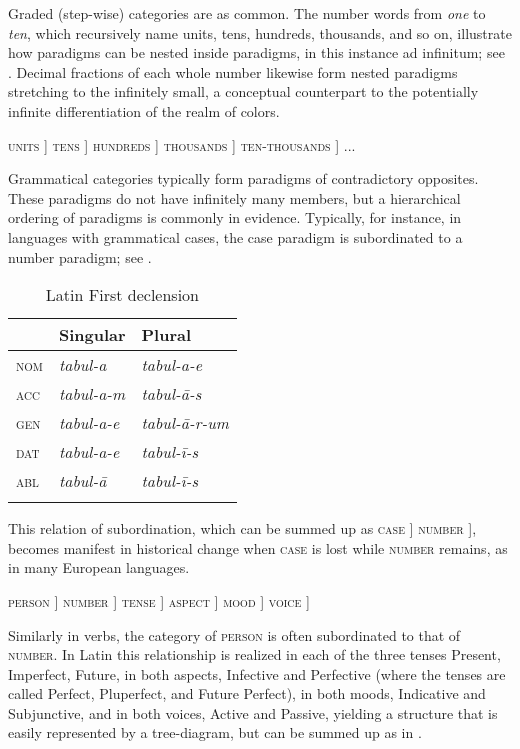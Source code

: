 \documentclass[output=paper, colorlinks,citecolor=brown]{langsci/langscibook}
\begin{document}
Graded (step-wise) categories are as common. The number words from \textit{one} to \textit{ten}, which recursively name units, tens, hundreds, thousands, and so on, illustrate how paradigms can be nested inside paradigms, in this instance ad infinitum; see . Decimal fractions of each whole number likewise form nested paradigms stretching to the infinitely small, a conceptual counterpart to the potentially infinite differentiation of the realm of colors. 

\begin{exe}
    \ex \label{ex:andersen_1} \textsc{units} ] \textsc{tens} ] \textsc{hundreds} ] \textsc{thousands} ] \textsc{ten-thousands} ] ...
\end{exe}

Grammatical categories typically form paradigms of contradictory opposites. These paradigms do not have infinitely many members, but a hierarchical ordering of paradigms is commonly in evidence. Typically, for instance, in languages with grammatical cases, the case paradigm is subordinated to a number paradigm; see . 

\begin{table}
\caption{Latin First declension\label{tab:andersen_1}}
\begin{tabular}{>{\scshape}lll} 
\lsptoprule
& Singular & Plural\\\midrule
nom & \textit{tabul-a} & \textit{tabul-a-e}\\
acc & \textit{tabul-a-m} & \textit{tabul-ā-s}\\
gen & \textit{tabul-a-e} & \textit{tabul-ā-r-um} \\
dat & \textit{tabul-a-e} & \textit{tabul-ī-s}\\
abl & \textit{tabul-ā} & \textit{tabul-ī-s}\\
\lspbottomrule
\end{tabular}
\end{table}

This relation of subordination, which can be summed up as \textsc{case} ] \textsc{number} ], becomes manifest in historical change when \textsc{case} is lost while \textsc{number} remains, as in many European languages. 

\begin{exe}
    \ex \label{ex:andersen_2} \textsc{person} ] \textsc{number} ] \textsc{tense} ] \textsc{aspect} ] \textsc{mood} ] \textsc{voice} ] 
\end{exe}


Similarly in verbs, the category of \textsc{person} is often subordinated to that of \textsc{number}. In Latin this relationship is realized in each of the three tenses Present, Imperfect, Future, in both aspects, Infective and Perfective (where the tenses are called Perfect, Pluperfect, and Future Perfect), in both moods, Indicative and Subjunctive, and in both voices, Active and Passive, yielding a structure that is easily represented by a tree-diagram, but can be summed up as in .
\end{document}
